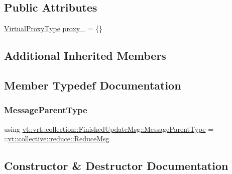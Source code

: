 \subsection*{Public Attributes}
\begin{DoxyCompactItemize}
\item 
\hyperlink{namespacevt_a1b417dd5d684f045bb58a0ede70045ac}{Virtual\+Proxy\+Type} \hyperlink{structvt_1_1vrt_1_1collection_1_1_finished_update_msg_a1058ef4d7be406b0cfa0eb768f7ec242}{proxy\+\_\+} = \{\}
\end{DoxyCompactItemize}
\subsection*{Additional Inherited Members}


\subsection{Member Typedef Documentation}
\mbox{\label{structvt_1_1vrt_1_1collection_1_1_finished_update_msg_a0dc68be7527f1b664860af8d6b58f667}} 
\subsubsection{\texorpdfstring{Message\+Parent\+Type}{MessageParentType}}
{\footnotesize\ttfamily using \hyperlink{structvt_1_1vrt_1_1collection_1_1_finished_update_msg_a0dc68be7527f1b664860af8d6b58f667}{vt\+::vrt\+::collection\+::\+Finished\+Update\+Msg\+::\+Message\+Parent\+Type} =  \+::\hyperlink{structvt_1_1collective_1_1reduce_1_1_reduce_msg}{vt\+::collective\+::reduce\+::\+Reduce\+Msg}}



\subsection{Constructor \& Destructor Documentation}
\mbox{\label{structvt_1_1vrt_1_1collection_1_1_finished_update_msg_a2388118a8c2f8b252df3b03a2fef2bdc}} 
